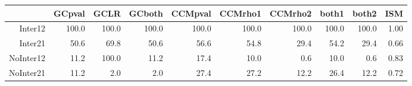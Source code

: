 \begin{table}[ht]
\centering
\begin{tabular}{rrrrrrrrrr}
  \hline
 & GCpval & GCLR & GCboth & CCMpval & CCMrho1 & CCMrho2 & both1 & both2 & ISM \\ 
  \hline
Inter12 & 100.0 & 100.0 & 100.0 & 100.0 & 100.0 & 100.0 & 100.0 & 100.0 & 1.00 \\ 
  Inter21 & 50.6 & 69.8 & 50.6 & 56.6 & 54.8 & 29.4 & 54.2 & 29.4 & 0.66 \\ 
  NoInter12 & 11.2 & 100.0 & 11.2 & 17.4 & 10.0 & 0.6 & 10.0 & 0.6 & 0.83 \\ 
  NoInter21 & 11.2 & 2.0 & 2.0 & 27.4 & 27.2 & 12.2 & 26.4 & 12.2 & 0.72 \\ 
   \hline
\end{tabular}
\end{table}
